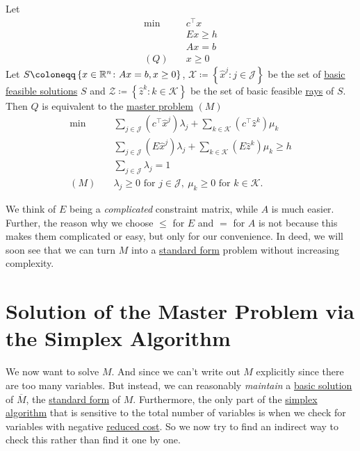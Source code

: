 \begin{theorem}\label{thm:decomposition-theorem}
	Let
	\[
		\begin{aligned}
			\min~    & c^{\top}x \\
			         & Ex \geq h \\
			         & Ax = b    \\
			(Q)\quad & x\geq 0
		\end{aligned}
	\]
	Let \(S\coloneqq \left\{ x\in\mathbb{\MakeUppercase{R}}^n\colon Ax = b, x\geq 0 \right\}\), \(\mathcal{X} \coloneqq \left\{\hat{x}^j\colon j\in\mathcal{J} \right\}\) be
	the set of \hyperref[def:basic-solution]{basic} \hyperref[def:feasible-solution]{feasible solutions} \(S\) and
	\(\mathcal{Z} \coloneqq \left\{\hat{z}^k\colon k\in\mathcal{K} \right\}\) be the set of basic feasible \hyperref[def:ray]{rays} of \(S\). Then \(Q\) is equivalent to
	the \hyperref[def:master-problem]{master problem} \((M)\)
	\[
		\begin{aligned}
			\min~    & \sum\limits_{j\in\mathcal{J}}\left(c^{\top}\hat{x}^j\right)\lambda_{j} + \sum\limits_{k\in\mathcal{K}}\left(c^{\top} \hat{z}^k  \right)\mu_k \\
			         & \sum\limits_{j\in\mathcal{J}}\left(E\hat{x}^j\right)\lambda_{j} + \sum\limits_{k\in\mathcal{K}}\left(E \hat{z}^k \right)\mu_k \geq h         \\
			         & \sum\limits_{j\in\mathcal{J}}\lambda_{j} = 1                                                                                                 \\
			(M)\quad & \lambda_{j}\geq 0 \text{ for }j\in\mathcal{J},\ \mu_k\geq 0 \text{ for }k\in\mathcal{K}.
		\end{aligned}
	\]
\end{theorem}

\begin{remark}
	We think of \(E\) being a \emph{complicated} constraint matrix, while \(A\) is much easier. Further, the reason why we choose \(\leq \) for \(E\) and \(=\) for \(A\) is not because
	this makes them complicated or easy, but only for our convenience. In deed, we will soon see that we can turn \(M\) into a \hyperref[def:standard-form]{standard form} problem
	without increasing complexity.
\end{remark}

\section{Solution of the Master Problem via the Simplex Algorithm}
We now want to solve \(M\). And since we can't write out \(M\) explicitly since there are too many variables. But instead, we can reasonably
\emph{maintain} a \hyperref[def:basic-solution]{basic solution} of \(\overline{M}\), the \hyperref[def:standard-form]{standard form} of \(M\).
Furthermore, the only part of the \hyperref[algo:simplex-algorithm]{simplex algorithm} that is sensitive to the total number of variables is
when we check for variables with negative \hyperref[def:reduced-cost]{reduced cost}. So we now try to find an indirect way to check this rather than find it one by one.

